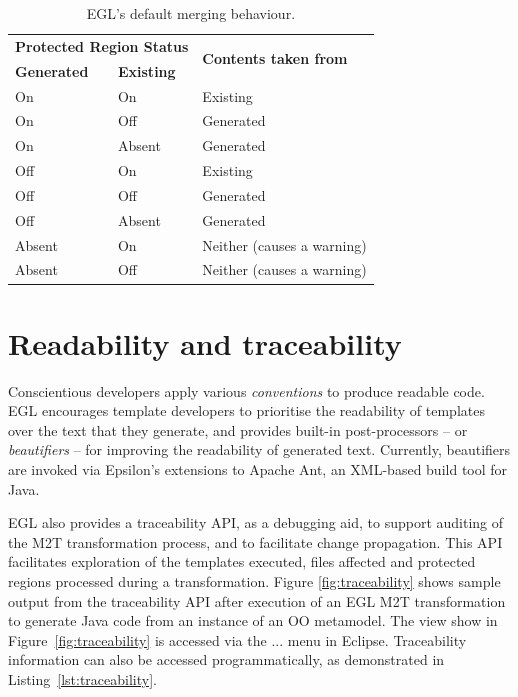 \begin{table}[htbp]
  \begin{center}
  \begin{tabular}{|l|l|l|}
  \hline
  \multicolumn{2}{|l|}{\textbf{Protected Region Status}} & \multirow{2}{*}{\textbf{Contents taken from}} \\
  \textbf{Generated} & \textbf{Existing} & \\
  \hline
  On & On     & Existing  \\
  On & Off    & Generated \\
  On & Absent & Generated \\
  \hline
  Off & On     & Existing  \\
  Off & Off    & Generated \\
  Off & Absent & Generated \\
  \hline
  Absent & On  & Neither (causes a warning) \\
  Absent & Off & Neither (causes a warning) \\
  \hline
  \end{tabular}
  \end{center}
\caption{EGL's default merging behaviour.}
\label{tab:merging}
\end{table}

\section{Readability and traceability} 
Conscientious developers apply various \emph{conventions} to produce
readable code. EGL encourages template developers to prioritise the
readability of templates over the text that they generate, and provides
built-in post-processors -- or \textit{beautifiers} -- for improving
the readability of generated text.  Currently, beautifiers are
invoked via Epsilon's extensions to Apache Ant, an
XML-based build tool for Java.

EGL also provides a traceability API, as a debugging aid, to
support auditing of the M2T transformation process, and to facilitate
change propagation.  This API facilitates exploration of the templates 
executed, files affected and protected regions processed during a transformation. 
Figure \ref{fig:traceability} shows sample output from the traceability API
after execution of an EGL M2T transformation to generate Java
code from an instance of an OO metamodel. The view show in Figure~\ref{fig:traceability}
is accessed via the ... menu in Eclipse. Traceability information can
also be accessed programmatically, as demonstrated in Listing~\ref{lst:traceability}.

